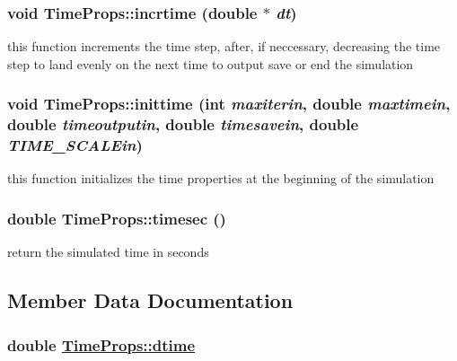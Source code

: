 \hypertarget{structTimeProps_a1}{
\subsubsection[incrtime]{\setlength{\rightskip}{0pt plus 5cm}void Time\-Props::incrtime (double $\ast$ {\em dt})}}
\label{structTimeProps_a1}


this function increments the time step, after, if neccessary, decreasing the time step to land evenly on the next time to output save or end the simulation 

\hypertarget{structTimeProps_a0}{
\subsubsection[inittime]{\setlength{\rightskip}{0pt plus 5cm}void Time\-Props::inittime (int {\em maxiterin}, double {\em maxtimein}, double {\em timeoutputin}, double {\em timesavein}, double {\em TIME\_\-SCALEin})}}
\label{structTimeProps_a0}


this function initializes the time properties at the beginning of the simulation 

\hypertarget{structTimeProps_a9}{
\subsubsection[timesec]{\setlength{\rightskip}{0pt plus 5cm}double Time\-Props::timesec ()}}
\label{structTimeProps_a9}


return the simulated time in seconds 



\subsection{Member Data Documentation}
\hypertarget{structTimeProps_o12}{
\subsubsection[dtime]{\setlength{\rightskip}{0pt plus 5cm}double \hyperlink{structTimeProps_o12}{Time\-Props::dtime}}}
\label{structTimeProps_o12}


